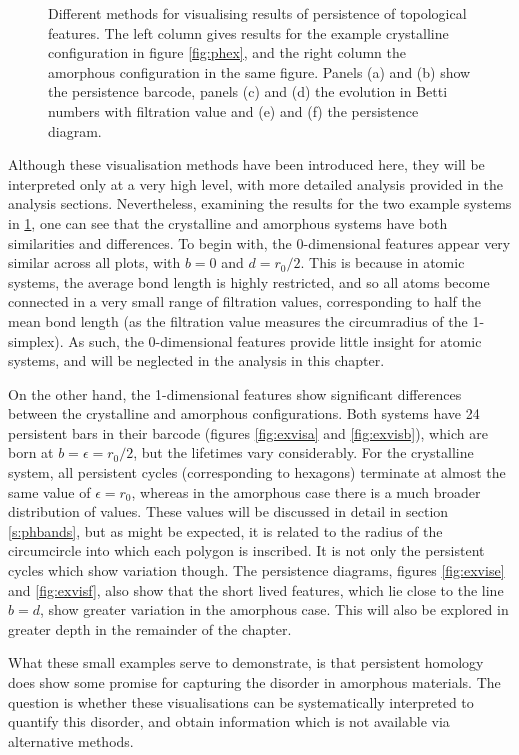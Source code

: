 \begin{figure}[tbp]
	\caption{Different methods for visualising results of persistence of topological features. The left column gives results for the example crystalline configuration in figure \ref{fig:phex}, and the right column the amorphous configuration in the same figure. Panels (a) and (b) show the persistence barcode, panels (c) and (d) the evolution in Betti numbers with filtration value and (e) and (f) the persistence diagram.}
	\label{fig:exvis}
\end{figure}

Although these visualisation methods have been introduced here, they will be interpreted only at a very high level, with more detailed analysis provided in the analysis sections.
Nevertheless, examining the results for the two example systems in \ref{fig:exvis}, one can see that the crystalline and amorphous systems have both similarities and differences.
To begin with, the 0\--dimensional features appear very similar across all plots, with $b=0$ and $d=r_0/2$.
This is because in atomic systems, the average bond length is highly restricted, and so all atoms become connected in a very small range of filtration values, corresponding to half the mean bond length (as the filtration value measures the circumradius of the 1\--simplex).
As such, the $0$\--dimensional features provide little insight for atomic systems, and will be neglected in the analysis in this chapter.

On the other hand, the 1\--dimensional features show significant differences between the crystalline and amorphous configurations.
Both systems have 24 persistent bars in their barcode (figures \ref{fig:exvisa} and \ref{fig:exvisb}), which are born at $b=\epsilon=r_0/2$, but the lifetimes vary considerably. 
For the crystalline system, all persistent cycles (corresponding to hexagons) terminate at almost the same value of $\epsilon=r_0$, whereas in the amorphous case there is a much broader distribution of values.
These values will be discussed in detail in section \ref{s:phbands}, but as might be expected, it is related to the radius of the circumcircle into which each polygon is inscribed. 
It is not only the persistent cycles which show variation though.
The persistence diagrams, figures \ref{fig:exvise} and \ref{fig:exvisf}, also show that the short lived features, which lie close to the line $b=d$, show greater variation in the amorphous case.
This will also be explored in greater depth in the remainder of the chapter.

What these small examples serve to demonstrate, is that persistent homology does show some promise for capturing the disorder in amorphous materials.
The question is whether these visualisations can be systematically interpreted to quantify this disorder, and obtain information which is not available via alternative methods.

